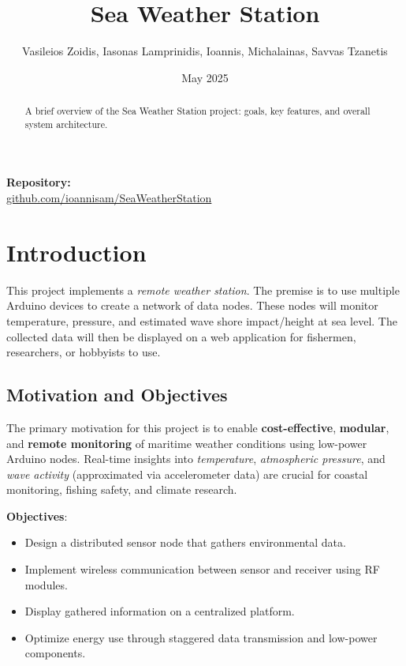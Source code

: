 \documentclass{article}
\title{Sea Weather Station}
\author{Vasileios Zoidis, Iasonas Lamprinidis, Ioannis, Michalainas, Savvas Tzanetis}
\date{May 2025}
\begin{document}
\maketitle
\begin{center}
  \textbf{Repository:} \\
  \href{https://github.com/ioannisam/SeaWeatherStation}{github.com/ioannisam/SeaWeatherStation}
\end{center}
\bigskip
\begin{abstract}
    A brief overview of the Sea Weather Station project: goals, key features, and overall system architecture.
\end{abstract}
\tableofcontents
\clearpage

\section{Introduction}
This project implements a \textit{remote weather station}. The premise is to use multiple Arduino devices to create a network of data nodes. These nodes will monitor temperature, pressure, and estimated wave shore impact/height at sea level. The collected data will then be displayed on a web application for fishermen, researchers, or hobbyists to use.
    
    \subsection{Motivation and Objectives}

    The primary motivation for this project is to enable \textbf{cost-effective}, \textbf{modular}, and \textbf{remote monitoring} of maritime weather conditions using low-power Arduino nodes. Real-time insights into \textit{temperature}, \textit{atmospheric pressure}, and \textit{wave activity} (approximated via accelerometer data) are crucial for coastal monitoring, fishing safety, and climate research.
    
\vspace{0.5cm}
\textbf{Objectives}:
\begin{itemize}
    \item Design a distributed sensor node that gathers environmental data.
    \item Implement wireless communication between sensor and receiver using RF modules.
    \item Display gathered information on a centralized platform.
    \item Optimize energy use through staggered data transmission and low-power components.
\end{itemize}
    
\end{document}
